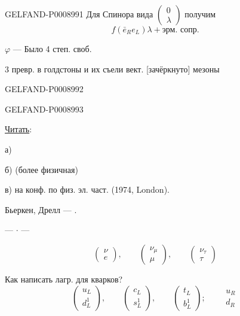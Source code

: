 \begin{GelfandAdjacentEvidence}{GELFAND-P000899}{1}
Для Спинора вида $\begin{pmatrix}0\\\lambda\end{pmatrix}$ получим
\[
f(\bar e_R e_L)\lambda+\text{эрм. сопр.}
\]

$\varphi$ — Было 4 степ. своб.

3 превр. в голдстоны и их съели вект. [зачёркнуто] мезоны
\end{GelfandAdjacentEvidence}
\begin{GelfandAdjacentEvidence}{GELFAND-P000899}{2}

\end{GelfandAdjacentEvidence}
\begin{GelfandAdjacentEvidence}{GELFAND-P000899}{3}


\uline{Читать}:

а) 

б)  (более физичная)

в)  на конф. по физ. эл. част. (1974, London).

Бьеркен, Дрелл — .

\begin{center}— \(\cdot\) —\end{center}
\[
\begin{pmatrix}\nu\\e\end{pmatrix},\qquad
\begin{pmatrix}\nu_\mu\\\mu\end{pmatrix},\qquad
\begin{pmatrix}\nu_\tau\\\tau\end{pmatrix}
\]

Как написать лагр. для кварков?
\[
\begin{pmatrix}u_L\\d_L^1\end{pmatrix},\qquad
\begin{pmatrix}c_L\\s_L^1\end{pmatrix},\qquad
\begin{pmatrix}t_L\\b_L^1\end{pmatrix}\mathpunct{;}\qquad
\begin{matrix}u_R\\d_R\end{matrix}
\]
\end{GelfandAdjacentEvidence}
